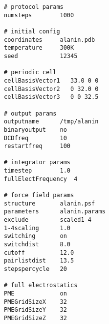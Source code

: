 \begin{verbatim}
# protocol params
numsteps        1000

# initial config
coordinates     alanin.pdb
temperature     300K
seed            12345

# periodic cell
cellBasisVector1   33.0 0 0
cellBasisVector2   0 32.0 0
cellBasisVector3   0 0 32.5

# output params
outputname      /tmp/alanin
binaryoutput    no
DCDfreq         10
restartfreq     100

# integrator params
timestep        1.0
fullElectFrequency  4

# force field params
structure       alanin.psf
parameters      alanin.params
exclude         scaled1-4
1-4scaling      1.0
switching       on
switchdist      8.0
cutoff          12.0
pairlistdist    13.5
stepspercycle   20

# full electrostatics
PME             on
PMEGridSizeX    32
PMEGridSizeY    32
PMEGridSizeZ    32
\end{verbatim}
\newpage
